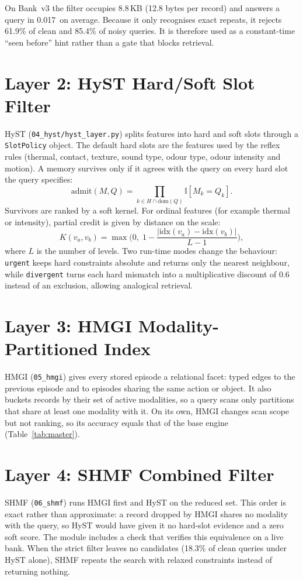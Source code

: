 \documentclass[12pt,a4paper,oneside]{report}
\newcommand{\code}[1]{\texttt{\small #1}}
\newcommand{\ms}{\,\text{ms}}
\begin{document}
On Bank~v3 the filter occupies 8.8\,KB (12.8 bytes per record) and answers a query in 0.017\ms{} on average. Because it only recognises exact repeats, it rejects 61.9\% of clean and 85.4\% of noisy queries. It is therefore used as a constant-time ``seen before'' hint rather than a gate that blocks retrieval.

\section{Layer 2: HyST Hard/Soft Slot Filter}\label{sec:hyst}
HyST (\code{04\_hyst/hyst\_layer.py}) splits features into hard and soft slots through a \code{SlotPolicy} object. The default hard slots are the features used by the reflex rules (thermal, contact, texture, sound type, odour type, odour intensity and motion). A memory survives only if it agrees with the query on every hard slot the query specifies:
\begin{equation}
  \mathrm{admit}(M, Q) = \prod_{k \in H \cap \mathrm{dom}(Q)} \mathbb{I}\left[M_k = Q_k\right].
\end{equation}
Survivors are ranked by a soft kernel. For ordinal features (for example thermal or intensity), partial credit is given by distance on the scale:
\begin{equation}
  K(v_a, v_b) = \max\Big(0,\; 1 - \frac{|\mathrm{idx}(v_a) - \mathrm{idx}(v_b)|}{L - 1}\Big),
\end{equation}
where $L$ is the number of levels. Two run-time modes change the behaviour: \code{urgent} keeps hard constraints absolute and returns only the nearest neighbour, while \code{divergent} turns each hard mismatch into a multiplicative discount of $0.6$ instead of an exclusion, allowing analogical retrieval.

\section{Layer 3: HMGI Modality-Partitioned Index}
HMGI (\code{05\_hmgi}) gives every stored episode a relational facet: typed edges to the previous episode and to episodes sharing the same action or object. It also buckets records by their set of active modalities, so a query scans only partitions that share at least one modality with it. On its own, HMGI changes scan scope but not ranking, so its accuracy equals that of the base engine (Table~\ref{tab:master}).

\section{Layer 4: SHMF Combined Filter}
SHMF (\code{06\_shmf}) runs HMGI first and HyST on the reduced set. This order is exact rather than approximate: a record dropped by HMGI shares no modality with the query, so HyST would have given it no hard-slot evidence and a zero soft score. The module includes a check that verifies this equivalence on a live bank. When the strict filter leaves no candidates (18.3\% of clean queries under HyST alone), SHMF repeats the search with relaxed constraints instead of returning nothing.
\end{document}
